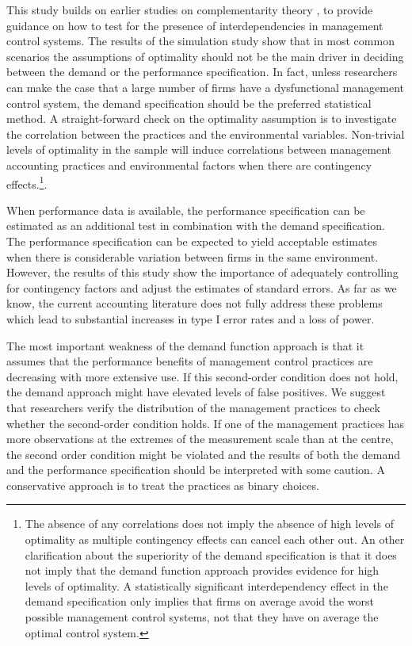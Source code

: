 \documentclass[12pt]{article}
\begin{document}
This study builds on earlier studies on complementarity theory \citep{milgrom_complementarities_1995, grabner_management_2013}, to provide guidance on how to test for the presence of interdependencies in management control systems. The results of the simulation study show that in most common scenarios the assumptions of optimality should not be the main driver in deciding between the demand or the performance specification. In fact, unless researchers can make the case that a large number of firms have a dysfunctional management control system, the demand specification should be the preferred statistical method. A straight-forward check on the optimality assumption is to investigate the correlation between the practices and the environmental variables. Non-trivial levels of optimality in the sample will induce correlations between management accounting practices and environmental factors when there are contingency effects.\footnote{The absence of any correlations does not imply the absence of high levels of optimality as multiple contingency effects can cancel each other out. An other clarification about the superiority of the demand specification is that it does not imply that the demand function approach provides evidence for high levels of optimality. A statistically significant interdependency effect in the demand specification only implies that firms on average avoid the worst possible management control systems, not that they have on average the optimal control system.}.

When performance data is available, the performance specification can be estimated as an additional test in combination with the demand specification. The performance specification can be expected to yield acceptable estimates when there is considerable variation between firms in the same environment. However, the results of this study show the importance of adequately controlling for contingency factors and adjust the estimates of standard errors. As far as we know, the current accounting literature does not fully address these problems which lead to substantial increases in type I error rates and a loss of power.

The most important weakness of the demand function approach is that it assumes that the performance benefits of management control practices are decreasing with more extensive use. If this second-order condition does not hold, the demand approach might have elevated levels of false positives. We suggest that researchers verify the distribution of the management practices to check whether the second-order condition holds. If one of the management practices has more observations at the extremes of the measurement scale than at the centre, the second order condition might be violated and the results of both the demand and the performance specification should be interpreted with some caution. A conservative approach is to treat the practices as binary choices. 
\end{document}
